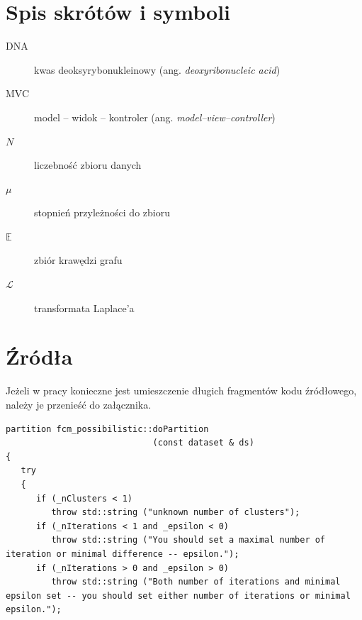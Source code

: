 \documentclass[a4paper,twoside,12pt]{book}
\newcommand{\obcy}[1]{\emph{#1}}
\newcommand{\ang}[1]{{\selectlanguage{british}\obcy{#1}}}
\newcounter{stronyPozaNumeracja}
\begin{document}
 

\backmatter 
{}
\setcounter{page}{\value{stronyPozaNumeracja}}
\pagestyle{tylkoNumeryStron}
 






\begin{appendices}
 

\chapter*{Spis skrótów i symboli}

\begin{description}
\item[DNA] kwas deoksyrybonukleinowy (ang. \ang{deoxyribonucleic acid})
\item[MVC] model -- widok -- kontroler (ang. \ang{model--view--controller}) 
\item[$N$] liczebność zbioru danych
\item[$\mu$] stopnień przyleżności do zbioru
\item[$\mathbb{E}$] zbiór krawędzi grafu
\item[$\mathcal{L}$] transformata Laplace'a 
\end{description}


\chapter*{Źródła}

Jeżeli w pracy konieczne jest umieszczenie długich fragmentów kodu źródłowego, należy je przenieść do załącznika.

\begin{lstlisting}
partition fcm_possibilistic::doPartition
                             (const dataset & ds)
{
   try
   {
      if (_nClusters < 1)
         throw std::string ("unknown number of clusters");
      if (_nIterations < 1 and _epsilon < 0)
         throw std::string ("You should set a maximal number of iteration or minimal difference -- epsilon.");
      if (_nIterations > 0 and _epsilon > 0)
         throw std::string ("Both number of iterations and minimal epsilon set -- you should set either number of iterations or minimal epsilon.");
   

\end{lstlisting}
\end{appendices}
\end{document}
